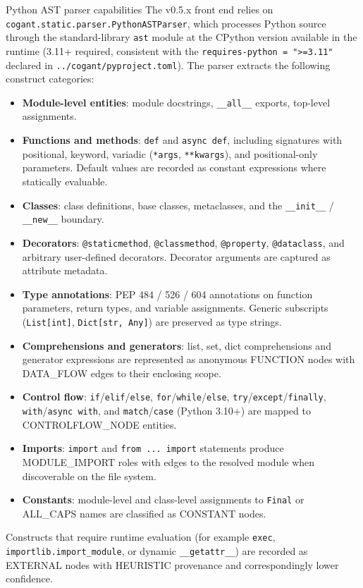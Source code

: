 \documentclass[
  ignorenonframetext,
]{beamer}
\providecommand{\tightlist}{%
  \setlength{\itemsep}{0pt}\setlength{\parskip}{0pt}}
\begin{document}
\begin{frame}[fragile]{Python AST parser capabilities}
\protect{}\label{python-ast-parser-capabilities}
The v0.5.x front end relies on
\texttt{cogant.static.parser.PythonASTParser}, which processes Python
source through the standard-library \texttt{ast} module at the CPython
version available in the runtime (3.11+ required, consistent with the
\texttt{requires-python\ =\ "\textgreater{}=3.11"} declared in
\texttt{../cogant/pyproject.toml}). The parser extracts the following
construct categories:

\begin{itemize}
\tightlist
\item
  \textbf{Module-level entities}: module docstrings,
  \texttt{\_\_all\_\_} exports, top-level assignments.
\item
  \textbf{Functions and methods}: \texttt{def} and \texttt{async\ def},
  including signatures with positional, keyword, variadic
  (\texttt{*args}, \texttt{**kwargs}), and positional-only parameters.
  Default values are recorded as constant expressions where statically
  evaluable.
\item
  \textbf{Classes}: class definitions, base classes, metaclasses, and
  the \texttt{\_\_init\_\_} / \texttt{\_\_new\_\_} boundary.
\item
  \textbf{Decorators}: \texttt{@staticmethod}, \texttt{@classmethod},
  \texttt{@property}, \texttt{@dataclass}, and arbitrary user-defined
  decorators. Decorator arguments are captured as attribute metadata.
\item
  \textbf{Type annotations}: PEP 484 / 526 / 604 annotations on function
  parameters, return types, and variable assignments. Generic subscripts
  (\texttt{List{[}int{]}}, \texttt{Dict{[}str,\ Any{]}}) are preserved
  as type strings.
\item
  \textbf{Comprehensions and generators}: list, set, dict comprehensions
  and generator expressions are represented as anonymous FUNCTION nodes
  with DATA\_FLOW edges to their enclosing scope.
\item
  \textbf{Control flow}: \texttt{if}/\texttt{elif}/\texttt{else},
  \texttt{for}/\texttt{while}/\texttt{else},
  \texttt{try}/\texttt{except}/\texttt{finally},
  \texttt{with}/\texttt{async\ with}, and \texttt{match}/\texttt{case}
  (Python 3.10+) are mapped to CONTROLFLOW\_NODE entities.
\item
  \textbf{Imports}: \texttt{import} and \texttt{from\ ...\ import}
  statements produce MODULE\_IMPORT roles with edges to the resolved
  module when discoverable on the file system.
\item
  \textbf{Constants}: module-level and class-level assignments to
  \texttt{Final} or ALL\_CAPS names are classified as CONSTANT nodes.
\end{itemize}

Constructs that require runtime evaluation (for example \texttt{exec},
\texttt{importlib.import\_module}, or dynamic \texttt{\_\_getattr\_\_})
are recorded as EXTERNAL nodes with HEURISTIC provenance and
correspondingly lower confidence.
\end{frame}
\end{document}
